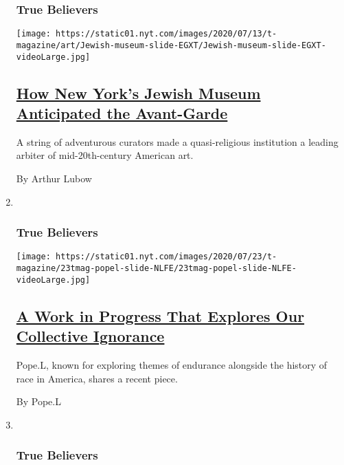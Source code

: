 \begin{enumerate}
{  \subsubsection{True Believers}\label{true-believers-6}}

  \texttt{[image: https://static01.nyt.com/images/2020/07/13/t-magazine/art/Jewish-museum-slide-EGXT/Jewish-museum-slide-EGXT-videoLarge.jpg]}

  \hypertarget{how-new-yorks-jewish-museum-anticipated-the-avant-garde}{%
  \subsection{\texorpdfstring{\href{/2020/07/23/t-magazine/jewish-museum-new-york.html}{How
  New York's Jewish Museum Anticipated the
  Avant-Garde}}{How New York's Jewish Museum Anticipated the Avant-Garde}}\label{how-new-yorks-jewish-museum-anticipated-the-avant-garde}}

  A string of adventurous curators made a quasi-religious institution a
  leading arbiter of mid-20th-century American art.

  By Arthur Lubow
\item ~
  \hypertarget{true-believers-7}{%
  \subsubsection{True Believers}\label{true-believers-7}}

  \texttt{[image: https://static01.nyt.com/images/2020/07/23/t-magazine/23tmag-popel-slide-NLFE/23tmag-popel-slide-NLFE-videoLarge.jpg]}

  \hypertarget{a-work-in-progress-that-explores-our-collective-ignorance}{%
  \subsection{\texorpdfstring{\href{/2020/07/23/t-magazine/pope-l-i-machine.html}{A
  Work in Progress That Explores Our Collective
  Ignorance}}{A Work in Progress That Explores Our Collective Ignorance}}\label{a-work-in-progress-that-explores-our-collective-ignorance}}

  Pope.L, known for exploring themes of endurance alongside the history
  of race in America, shares a recent piece.

  By Pope.L
\item ~
  \hypertarget{true-believers-8}{%
  \subsubsection{True Believers}\label{true-believers-8}}


\end{enumerate}
